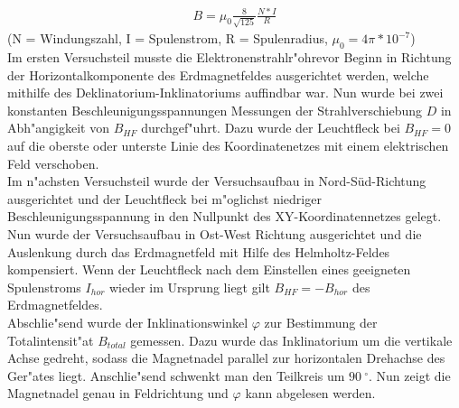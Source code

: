 		\begin{eqnarray*}
			B = \mu_0 \frac{8}{\sqrt{125}} \frac{N*I}{R}
		\end{eqnarray*}
		{\centering
		(N = Windungszahl, I = Spulenstrom, R = Spulenradius, $\mu_0 = 4\pi*10^{-7}$)\\
		}
		\vspace{0.3 cm}    
		Im ersten Versuchsteil musste die Elektronenstrahlr"ohrevor Beginn in Richtung der Horizontalkomponente des Erdmagnetfeldes ausgerichtet werden, welche mithilfe des Deklinatorium-Inklinatoriums auffindbar war. Nun wurde bei zwei konstanten Be\-schleu\-ni\-gungs\-span\-nun\-gen Messungen der Strahlverschiebung $D$ in Abh"angigkeit von $B_{HF}$ durchgef"uhrt. Dazu wurde der Leuchtfleck bei $B_{HF} = 0$ auf die oberste oder unterste Linie des Koordinatenetzes mit einem elektrischen Feld verschoben.\\
		\newline
		Im n"achsten Versuchsteil wurde der Versuchsaufbau in Nord-Süd-Richtung ausgerichtet und der Leuchtfleck bei m"oglichst niedriger Be\-schleu\-ni\-gungs\-span\-nun\-g in den Nullpunkt des XY-Koordinatennetzes gelegt.
		Nun wurde der Versuchsaufbau in Ost-West Richtung ausgerichtet und die Auslenkung durch das Erdmagnetfeld mit Hilfe des Helmholtz-Feldes kompensiert. Wenn der Leuchtfleck nach dem Einstellen eines geeigneten Spu\-len\-stroms $I_{hor}$ wieder im Ursprung liegt gilt $B_{HF} = -B_{hor}$ des Erdmagnetfeldes.\\
		\newline
		Abschlie"send wurde der Inklinationswinkel $\varphi$ zur Bestimmung der Totalintensit"at $B_{total}$ gemessen.
		Dazu wurde das Inklinatorium um die vertikale Achse gedreht, sodass die Magnetnadel parallel zur horizontalen Drehachse des Ger"ates liegt.
		Anschlie"send schwenkt man den Teilkreis um $\SI{90}{^\circ}$. Nun zeigt die Magnetnadel genau in Feldrichtung und $\varphi$ kann abgelesen werden.